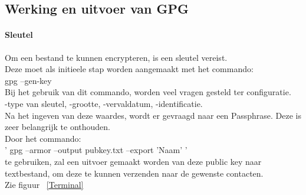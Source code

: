 \documentclass[12pt]{article}
\begin{document}
			\newpage		
			\subsection{Werking en uitvoer van GPG}\label{Werk}	
				\paragraph*{Sleutel} 
				Om een bestand te kunnen encrypteren, is een sleutel vereist.\\
				Deze moet als initieele stap worden aangemaakt met het commando:\\
				gpg --gen-key\\
				Bij het gebruik van dit commando, worden veel vragen gesteld ter configuratie.\\
				-type van sleutel, -grootte, -vervaldatum, -identificatie.\\
				Na het ingeven van deze waardes, wordt er gevraagd naar een Passphrase.
				Deze is zeer belangrijk te onthouden.\\
				Door het commando:\\
				' gpg --armor --output pubkey.txt --export 'Naam' '\\
				te gebruiken, zal een uitvoer gemaakt worden van deze public key naar textbestand,
				om deze te kunnen verzenden naar de gewenste contacten.\\
				Zie figuur ~\ref{Terminal}\\
				
\end{document}

